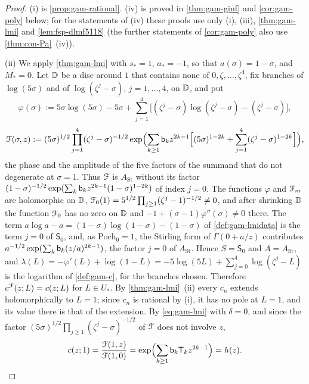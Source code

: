 \begin{proof}
(i) is \cref{prop:gam-rational}. (iv) is proved in \cref{thm:gam-ginf} and \cref{cor:gam-poly} below; for the statements of (iv) these proofs use only (i), (iii), \cref{thm:gam-lmi} and \cref{lem:fsp-dlmf5118} (the further statements of \cref{cor:gam-poly} also use \cref{thm:con-Pa}~(iv)).

(ii) We apply \cref{thm:gam-lmi} with $s_*=1$, $a_*=-1$, so that $a(\sigma)=1-\sigma$, and $M_*=0$. Let $\mathbb{D}$ be a disc around $1$ that contains none of $0,\zeta,\dots,\zeta^4$, fix branches of $\log(5\sigma)$ and of $\log(\zeta^j-\sigma)$, $j=1,\dots,4$, on $\mathbb{D}$, and put
\[
\varphi(\sigma):=5\sigma\log(5\sigma)-5\sigma+\sum_{j=1}^4\bigl[(\zeta^j-\sigma)\log(\zeta^j-\sigma)-(\zeta^j-\sigma)\bigr],
\]
\[
\mathcal{F}(\sigma,z):=(5\sigma)^{1/2}\prod_{j=1}^4(\zeta^j-\sigma)^{-1/2}\exp\Bigl(\sum_{k\geq 1}\mathsf{b}_kz^{2k-1}\Bigl[(5\sigma)^{1-2k}+\sum_{j=1}^4(\zeta^j-\sigma)^{1-2k}\Bigr]\Bigr),
\]
the phase and the amplitude of the five factors of the summand that do not degenerate at $\sigma=1$. Thus $\mathcal{F}$ is $A_{\mathrm{St}}$ without its factor $(1-\sigma)^{-1/2}\exp(\sum_k\mathsf{b}_kz^{2k-1}(1-\sigma)^{1-2k})$ of index $j=0$. The functions $\varphi$ and $\mathcal{F}_m$ are holomorphic on $\mathbb{D}$, $\mathcal{F}_0(1)=5^{1/2}\prod_{j\geq 1}(\zeta^j-1)^{-1/2}\neq 0$, and after shrinking $\mathbb{D}$ the function $\mathcal{F}_0$ has no zero on $\mathbb{D}$ and $-1+(\sigma-1)\varphi''(\sigma)\neq 0$ there. The term $a\log a-a=(1-\sigma)\log(1-\sigma)-(1-\sigma)$ of \cref{def:gam-lmidata} is the term $j=0$ of $\mathsf S_0$, and, as $\mathrm{Poch}_0=1$, the Stirling form of $\Gamma(0+a/z)$ contributes $a^{-1/2}\exp(\sum_k\mathsf{b}_k(z/a)^{2k-1})$, the factor $j=0$ of $A_{\mathrm{St}}$. Hence $S=\mathsf S_0$ and $A=A_{\mathrm{St}}$, and $\lambda(L)=-\varphi'(L)+\log(1-L)=-5\log(5L)+\sum_{j=0}^4\log(\zeta^j-L)$ is the logarithm of \cref{def:gam-c}, for the branches chosen. Therefore $c^{\mathcal{F}}(z;L)=c(z;L)$ for $L\in U_*$. By \cref{thm:gam-lmi}~(ii) every $c_n$ extends holomorphically to $L=1$; since $c_n$ is rational by (i), it has no pole at $L=1$, and its value there is that of the extension. By \eqref{eq:gam-lmi} with $\delta=0$, and since the factor $(5\sigma)^{1/2}\prod_{j\geq 1}(\zeta^j-\sigma)^{-1/2}$ of $\mathcal{F}$ does not involve $z$,
\[
c(z;1)=\frac{\mathcal{F}(1,z)}{\mathcal{F}(1,0)}=\exp\Bigl(\sum_{k\geq 1}\mathsf{b}_k\mathsf T_kz^{2k-1}\Bigr)=h(z).
\]


\end{proof}

